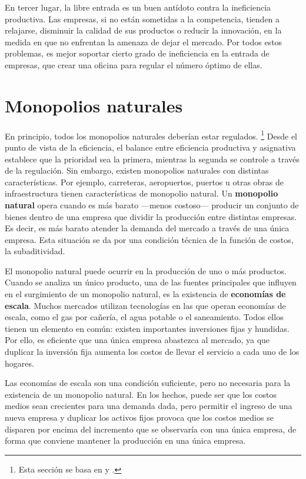 \documentclass[
  12pt,
  spanish,
]{book}
\begin{document}
En tercer lugar, la libre entrada es un buen antídoto contra la
ineficiencia productiva. Las empresas, si no están sometidas a la
competencia, tienden a relajarse, disminuir la calidad de sus productos
o reducir la innovación, en la medida en que no enfrentan la amenaza de
dejar el mercado. Por todos estos problemas, es mejor soportar cierto
grado de ineficiencia en la entrada de empresas, que crear una oficina
para regular el número óptimo de ellas.

\hypertarget{monop-nat}{%
\section{Monopolios naturales}\label{monop-nat}}

En principio, todos los monopolios naturales deberían estar regulados.
\footnote{Esta sección se basa en \citet{Viscusi2005} y
  \citet{Joskow2007}.} Desde el punto de vista de la eficiencia, el
balance entre eficiencia productiva y asignativa establece que la
prioridad sea la primera, mientras la segunda se controle a través de la
regulación. Sin embargo, existen monopolios naturales con distintas
características. Por ejemplo, carreteras, aeropuertos, puertos u otras
obras de infraestructura tienen características de monopolio natural. Un
\textbf{monopolio natural} opera cuando es más barato ---menos
costoso--- producir un conjunto de bienes dentro de una empresa que
dividir la producción entre distintas empresas. Es decir, es más barato
atender la demanda del mercado a través de una única empresa. Esta
situación se da por una condición técnica de la función de costos, la
subaditividad.

El monopolio natural puede ocurrir en la producción de uno o más
productos. Cuando se analiza un único producto, una de las fuentes
principales que influyen en el surgimiento de un monopolio natural, es
la existencia de \textbf{economías de escala}. Muchos mercados utilizan
tecnologías en las que operan economías de escala, como el gas por
cañería, el agua potable o el saneamiento. Todos ellos tienen un
elemento en común: existen importantes inversiones fijas y hundidas. Por
ello, es eficiente que una única empresa abastezca al mercado, ya que
duplicar la inversión fija aumenta los costos de llevar el servicio a
cada uno de los hogares.

Las economías de escala son una condición suficiente, pero no necesaria
para la existencia de un monopolio natural. En los hechos, puede ser que
los costos medios sean crecientes para una demanda dada, pero permitir
el ingreso de una nueva empresa y duplicar los activos fijos provoca que
los costos medios se disparen por encima del incremento que se
observaría con una única empresa, de forma que conviene mantener la
producción en una única empresa.
\end{document}

